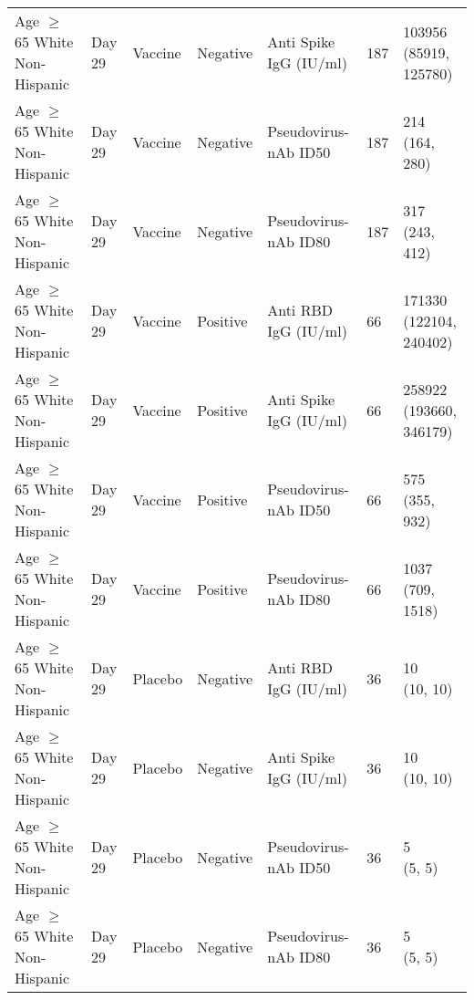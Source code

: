 \documentclass[]{book}
\theoremstyle{definition}
\theoremstyle{definition}
\theoremstyle{definition}
\newcommand{\1}{\mathbbm{1}}
\begin{document}
\begin{landscape}
\begin{ThreePartTable}
\begin{longtable}[t]{>{\raggedright\arraybackslash}p{7cm}llllll}
\hspace{1em}Age $\geq$ 65 White Non-Hispanic & Day 29 & Vaccine & Negative & Anti Spike IgG (IU/ml) & 187 & \makecell[l]{103956\\(85919, 125780)}\\
\hspace{1em}Age $\geq$ 65 White Non-Hispanic & Day 29 & Vaccine & Negative & Pseudovirus-nAb ID50 & 187 & \makecell[l]{214\\(164, 280)}\\
\hspace{1em}Age $\geq$ 65 White Non-Hispanic & Day 29 & Vaccine & Negative & Pseudovirus-nAb ID80 & 187 & \makecell[l]{317\\(243, 412)}\\
\hspace{1em}Age $\geq$ 65 White Non-Hispanic & Day 29 & Vaccine & Positive & Anti RBD IgG (IU/ml) & 66 & \makecell[l]{171330\\(122104, 240402)}\\
\hspace{1em}Age $\geq$ 65 White Non-Hispanic & Day 29 & Vaccine & Positive & Anti Spike IgG (IU/ml) & 66 & \makecell[l]{258922\\(193660, 346179)}\\
\hspace{1em}Age $\geq$ 65 White Non-Hispanic & Day 29 & Vaccine & Positive & Pseudovirus-nAb ID50 & 66 & \makecell[l]{575\\(355, 932)}\\
\hspace{1em}Age $\geq$ 65 White Non-Hispanic & Day 29 & Vaccine & Positive & Pseudovirus-nAb ID80 & 66 & \makecell[l]{1037\\(709, 1518)}\\
\hspace{1em}Age $\geq$ 65 White Non-Hispanic & Day 29 & Placebo & Negative & Anti RBD IgG (IU/ml) & 36 & \makecell[l]{10\\(10, 10)}\\
\hspace{1em}Age $\geq$ 65 White Non-Hispanic & Day 29 & Placebo & Negative & Anti Spike IgG (IU/ml) & 36 & \makecell[l]{10\\(10, 10)}\\
\hspace{1em}Age $\geq$ 65 White Non-Hispanic & Day 29 & Placebo & Negative & Pseudovirus-nAb ID50 & 36 & \makecell[l]{5\\(5, 5)}\\
\hspace{1em}Age $\geq$ 65 White Non-Hispanic & Day 29 & Placebo & Negative & Pseudovirus-nAb ID80 & 36 & \makecell[l]{5\\(5, 5)}\\

\end{longtable}
\end{ThreePartTable}
\end{landscape}
\end{document}
